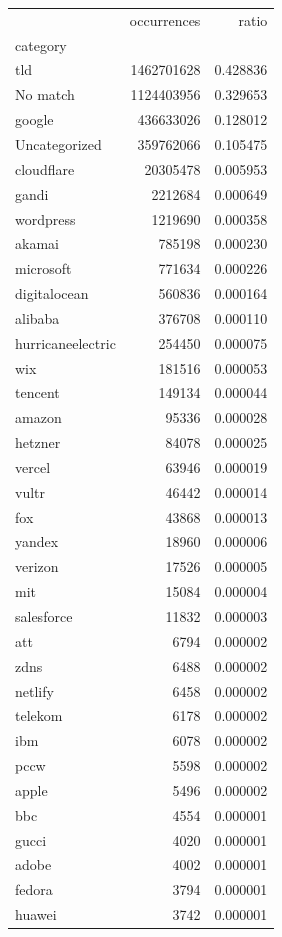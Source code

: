\begin{tabular}{lrr}
\toprule
 & occurrences & ratio \\
category &  &  \\
\midrule
tld & 1462701628 & 0.428836 \\
No match & 1124403956 & 0.329653 \\
google & 436633026 & 0.128012 \\
Uncategorized & 359762066 & 0.105475 \\
cloudflare & 20305478 & 0.005953 \\
gandi & 2212684 & 0.000649 \\
wordpress & 1219690 & 0.000358 \\
akamai & 785198 & 0.000230 \\
microsoft & 771634 & 0.000226 \\
digitalocean & 560836 & 0.000164 \\
alibaba & 376708 & 0.000110 \\
hurricaneelectric & 254450 & 0.000075 \\
wix & 181516 & 0.000053 \\
tencent & 149134 & 0.000044 \\
amazon & 95336 & 0.000028 \\
hetzner & 84078 & 0.000025 \\
vercel & 63946 & 0.000019 \\
vultr & 46442 & 0.000014 \\
fox & 43868 & 0.000013 \\
yandex & 18960 & 0.000006 \\
verizon & 17526 & 0.000005 \\
mit & 15084 & 0.000004 \\
salesforce & 11832 & 0.000003 \\
att & 6794 & 0.000002 \\
zdns & 6488 & 0.000002 \\
netlify & 6458 & 0.000002 \\
telekom & 6178 & 0.000002 \\
ibm & 6078 & 0.000002 \\
pccw & 5598 & 0.000002 \\
apple & 5496 & 0.000002 \\
bbc & 4554 & 0.000001 \\
gucci & 4020 & 0.000001 \\
adobe & 4002 & 0.000001 \\
fedora & 3794 & 0.000001 \\
huawei & 3742 & 0.000001 \\

\end{tabular}
